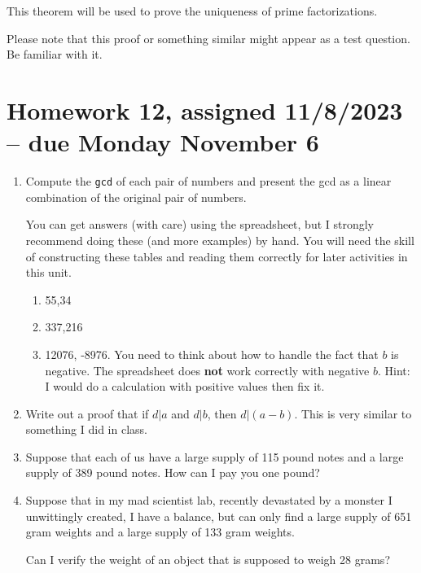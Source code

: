 \documentclass[12pt]{article}
\begin{document}
This theorem will be used to prove the uniqueness of prime factorizations.

Please note that this proof or something similar might appear as a test question.  Be familiar with it.

\section{Homework 12, assigned 11/8/2023  -- due Monday November 6}

\begin{enumerate}

\item  Compute the {\tt gcd} of each pair  of numbers and present the gcd as a linear combination of the original pair of numbers.

You can get answers (with care) using the spreadsheet, but I strongly recommend doing these (and more examples) by hand.  You will need the skill of constructing these tables and reading them correctly for later activities in this unit.

\begin{enumerate}

\item  55,34

\item 337,216

\item 12076, -8976.  You need to think about how to handle the fact that $b$ is negative.  The spreadsheet does {\bf not} work correctly with negative $b$.  Hint:  I would do a calculation with positive values then fix it.

\end{enumerate}

\item  Write out a proof that if $d|a$ and $d|b$, then $d|(a-b)$.  This is very similar to something I did in class.

\item  Suppose that each of us have a large supply of 115 pound notes and a large supply of 389 pound notes.
How can I pay you one pound?

\item  Suppose that in my mad scientist lab, recently devastated by a monster I unwittingly created, I have a balance, but can only find a large supply of 651 gram weights and a large supply of 133 gram weights.

Can I verify the weight of an object that is supposed to weigh 28 grams?


\end{enumerate}
\end{document}
